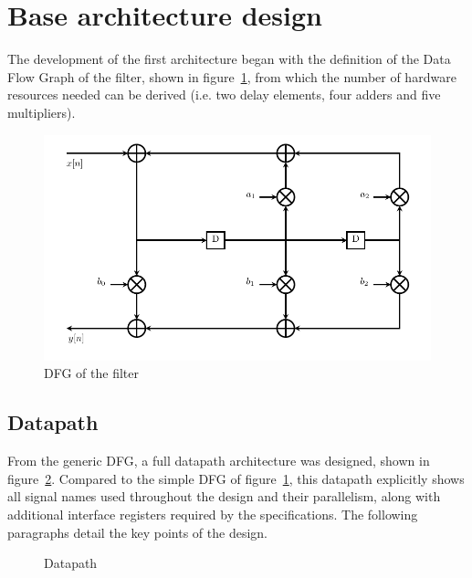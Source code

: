 \documentclass[a4paper]{article}
\begin{document}
\section{Base architecture design}
The development of the first architecture began with the definition of the Data Flow Graph of the filter, shown in figure~\ref{fig:base_dfg}, from which the number of hardware resources needed can be derived (i.e. two delay elements, four adders and five multipliers).

\begin{figure}[hbtp]
    \centering
    \includegraphics[width=.8\linewidth]{media/base_dfg.pdf}
    \caption{DFG of the filter}
    \label{fig:base_dfg}
\end{figure}

\subsection{Datapath}
From the generic DFG, a full datapath architecture was designed, shown in figure~\ref{fig:base_dp}. Compared to the simple DFG of figure~\ref{fig:base_dfg}, this datapath explicitly shows all signal names used throughout the design and their parallelism, along with additional interface registers required by the specifications. The following paragraphs detail the key points of the design. 

\begin{figure}[hbtp]
    \centering
    \caption{Datapath}
    \label{fig:base_dp}
\end{figure}
\end{document}
